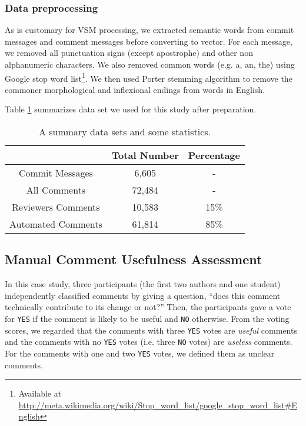 %

\subsubsection{Data preprocessing}
As is customary for VSM processing, we extracted semantic words from commit messages and comment messages before converting to vector.
For each message, we removed all punctuation signs (except apostrophe) and other non alphanumeric characters. We also removed common words (e.g. a, an, the) using Google stop word list\footnote{Available at \url{http://meta.wikimedia.org/wiki/Stop_word_list/google_stop_word_list#English}}. We then used Porter stemming algorithm to remove the commoner morphological and inflexional endings from words in English.

Table \ref{tb:datastatistic} summarizes data set we used for this study after preparation. 

\begin{table}[!h]
\caption{A summary data sets and some statistics.}
\centering
\small
\begin{tabular}{ccc}
\hline
& Total Number & Percentage \\ \hline \hline
Commit Messages & 6,605 &  -  \\ \hline
All Comments & 72,484& - \\ \hline
Reviewers Comments & 10,583 & 15\% \\ \hline
Automated Comments & 61,814 & 85\% \\ \hline 

\end{tabular}
\label{tb:datastatistic}
\end{table}

\subsection{Manual Comment Usefulness Assessment}
In this case study, three participants (the first two authors and one student) independently classified comments by giving a question, ``does this comment technically contribute to its change or not?''
Then, the participants gave a vote for \texttt{YES} if the comment is likely to be useful and \texttt{NO} otherwise.
From the voting scores, we regarded that the comments with three \texttt{YES} votes are \emph{useful} comments and the comments with no \texttt{YES} votes (i.e. three \texttt{NO} votes) are \emph{useless} comments. For the comments with one and two \texttt{YES} votes, we defined them as unclear comments.

